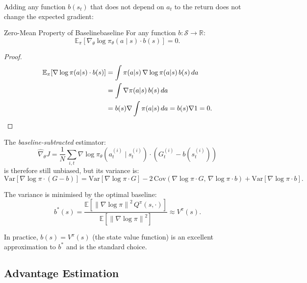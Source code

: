 \documentclass[11pt, a4paper]{article}
\newcommand{\R}{\mathbb{R}}
\newcommand{\E}{\mathbb{E}}
\newcommand{\grad}{\nabla}
\newcommand{\hgrad}{\hat{\nabla}}
\newcommand{\norm}[1]{\left\lVert #1 \right\rVert}
\begin{document}
Adding any function $b(s_t)$ that does not depend on $a_t$ to the return does not
change the expected gradient:

\begin{proposition}{Zero-Mean Property of Baseline}{baseline}
For any function $b : \mathcal{S} \to \R$:
\begin{equation}
    \E_\pi \left[ \grad_\theta \log \pi_\theta(a \mid s) \cdot b(s) \right] = 0.
\end{equation}
\end{proposition}

\begin{proof}
\begin{align}
    \E_\pi[\grad \log \pi(a|s) \cdot b(s)]
    &= \int \pi(a|s) \, \grad \log \pi(a|s) \, b(s) \, da \notag\\
    &= \int \grad \pi(a|s) \, b(s) \, da \notag\\
    &= b(s) \grad \int \pi(a|s) \, da
    = b(s) \grad 1 = 0. \notag
\end{align}
\end{proof}

The \emph{baseline-subtracted} estimator:
\begin{equation}
    \hgrad_\theta J = \frac{1}{N}\sum_{i,t} \grad \log \pi_\theta(a_t^{(i)} \mid s_t^{(i)}) \cdot (G_t^{(i)} - b(s_t^{(i)}))
    \label{eq:baseline}
\end{equation}
is therefore still unbiased, but its variance is:
\begin{equation}
    \mathrm{Var}\left[\grad \log \pi \cdot (G - b)\right]
    = \mathrm{Var}[\grad \log \pi \cdot G]
    - 2 \, \mathrm{Cov}(\grad \log \pi \cdot G, \, \grad \log \pi \cdot b)
    + \mathrm{Var}[\grad \log \pi \cdot b].
\end{equation}

The variance is minimised by the optimal baseline:
\begin{equation}
    b^*(s) = \frac{\E\left[ \norm{\grad \log \pi}^2 \, Q^\pi(s, \cdot) \right]}{\E\left[ \norm{\grad \log \pi}^2 \right]} \approx V^\pi(s).
\end{equation}

In practice, $b(s) = V^\pi(s)$ (the state value function) is an excellent
approximation to $b^*$ and is the standard choice.

\subsection{Advantage Estimation}
\end{document}
